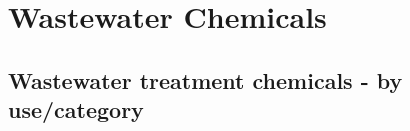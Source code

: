 
\chapter{Wastewater Chemicals}

\section{Wastewater treatment chemicals - by use/category}

\setlength{\arrayrulewidth}{0.1mm}
\setlength{\tabcolsep}{8 pt}
\renewcommand{\arraystretch}{1.3}
\begin{tabular}{ |p{5.5cm}|p{4.5cm}|p{5cm}|  }
\hline


\end{tabular}
